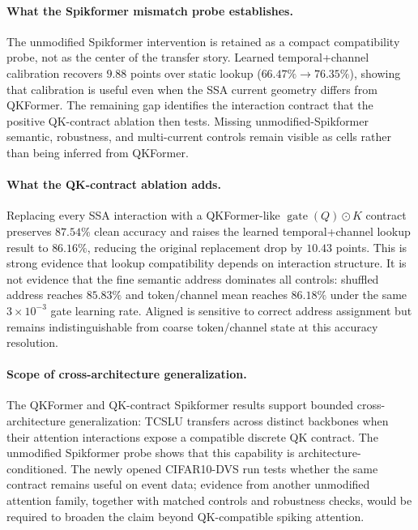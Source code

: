 \paragraph{What the Spikformer mismatch probe establishes.}
The unmodified Spikformer intervention is retained as a compact compatibility
probe, not as the center of the transfer story. Learned temporal+channel
calibration recovers $9.88$ points over static lookup
($66.47\%\rightarrow76.35\%$), showing that calibration is useful even when the
SSA current geometry differs from QKFormer. The remaining gap identifies the
interaction contract that the positive QK-contract ablation then tests.
Missing unmodified-Spikformer semantic, robustness, and multi-current controls
remain visible as \tbd{} cells rather than being inferred from QKFormer.

\paragraph{What the QK-contract ablation adds.}
Replacing every SSA interaction with a QKFormer-like
$\operatorname{gate}(Q)\odot K$ contract preserves $87.54\%$ clean accuracy
and raises the learned temporal+channel lookup result to $86.16\%$, reducing
the original replacement drop by $10.43$ points. This is strong evidence that
lookup compatibility depends on interaction structure. It is not evidence
that the fine semantic address dominates all controls: shuffled address reaches
$85.83\%$ and token/channel mean reaches $86.18\%$ under the same
$3\times10^{-3}$ gate learning rate. Aligned is sensitive to correct address
assignment but remains indistinguishable from coarse token/channel state at
this accuracy resolution.

\paragraph{Scope of cross-architecture generalization.}
The QKFormer and QK-contract Spikformer results support bounded
cross-architecture generalization: TCSLU transfers across distinct backbones
when their attention interactions expose a compatible discrete QK contract.
The unmodified Spikformer probe shows that this capability is
architecture-conditioned. The newly opened CIFAR10-DVS run tests whether the
same contract remains useful on event data; evidence from another unmodified
attention family, together with matched controls and robustness checks, would
be required to broaden the claim beyond QK-compatible spiking attention.

